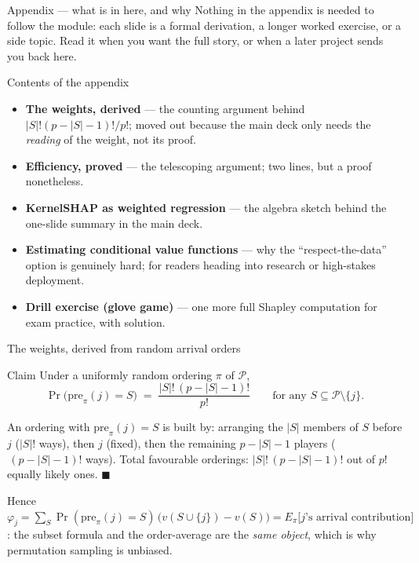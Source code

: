 \documentclass[aspectratio=169,11pt]{beamer}
\begin{document}
\begin{frame}{Appendix --- what is in here, and why}
  \small
  Nothing in the appendix is needed to follow the module: each slide is a
  formal derivation, a longer worked exercise, or a side topic. Read it when
  you want the full story, or when a later project sends you back here.
  \begin{block}{Contents of the appendix}
    \begin{itemize}
      \item \textbf{The weights, derived} --- the counting argument behind
            $|S|!(p-|S|-1)!/p!$; moved out because the main deck only needs the
            \emph{reading} of the weight, not its proof.
      \item \textbf{Efficiency, proved} --- the telescoping argument; two lines,
            but a proof nonetheless.
      \item \textbf{KernelSHAP as weighted regression} --- the algebra sketch
            behind the one-slide summary in the main deck.
      \item \textbf{Estimating conditional value functions} --- why the
            ``respect-the-data'' option is genuinely hard; for readers heading
            into research or high-stakes deployment.
      \item \textbf{Drill exercise (glove game)} --- one more full Shapley
            computation for exam practice, with solution.
    \end{itemize}
  \end{block}
\end{frame}

\begin{frame}{The weights, derived from random arrival orders}
  \begin{block}{Claim}
    Under a uniformly random ordering $\pi$ of $\mathcal{P}$,
    \[
      \Pr\bigl(\mathrm{pre}_\pi(j) = S\bigr) \;=\; \frac{|S|!\,(p-|S|-1)!}{p!}
      \qquad\text{for any } S \subseteq \mathcal{P}\setminus\{j\}.
    \]
  \end{block}
  \begin{readme}
    An ordering with $\mathrm{pre}_\pi(j)=S$ is built by: arranging the $|S|$
    members of $S$ before $j$ ($|S|!$ ways), then $j$ (fixed), then the remaining
    $p-|S|-1$ players ($\,(p-|S|-1)!$ ways). Total favourable orderings:
    $|S|!\,(p-|S|-1)!$ out of $p!$ equally likely ones. $\blacksquare$
  \end{readme}
  \begin{takeaway}
    Hence
    $\varphi_j=\sum_S \Pr(\mathrm{pre}_\pi(j)=S)\,\bigl(v(S\cup\{j\})-v(S)\bigr)
    = E_\pi\bigl[\text{$j$'s arrival contribution}\bigr]$: the subset formula and
    the order-average are the \emph{same object}, which is why permutation sampling
    is unbiased.
  \end{takeaway}
\end{frame}
\end{document}

